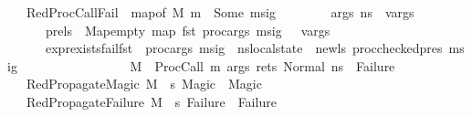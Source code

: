 \begin{isabellebody}
\ \ {\isacharbar}{\kern0pt}\ RedProcCallFail{\isacharcolon}{\kern0pt}\ {\isachardoublequoteopen}{\isasymlbrakk}\ map{\isacharunderscore}{\kern0pt}of\ M\ m\ {\isacharequal}{\kern0pt}\ Some\ msig{\isacharsemicolon}{\kern0pt}\isanewline
\ \ \ \ \ \ {\isasymLambda}{\isacharcomma}{\kern0pt}{\isasymGamma}{\isacharcomma}{\kern0pt}{\isasymOmega}\ {\isasymturnstile}\ {\isasymlangle}args{\isacharcomma}{\kern0pt}\ n{\isacharunderscore}{\kern0pt}s{\isasymrangle}\ {\isacharbrackleft}{\kern0pt}{\isasymDown}{\isacharbrackright}{\kern0pt}\ v{\isacharunderscore}{\kern0pt}args{\isacharsemicolon}{\kern0pt}\isanewline
\ \ \ \ \ \ pre{\isacharunderscore}{\kern0pt}ls\ {\isacharequal}{\kern0pt}\ Map{\isachardot}{\kern0pt}empty{\isacharparenleft}{\kern0pt}\ {\isacharparenleft}{\kern0pt}map\ fst\ {\isacharparenleft}{\kern0pt}proc{\isacharunderscore}{\kern0pt}args\ msig\ {\isacharparenright}{\kern0pt}{\isacharparenright}{\kern0pt}\ {\isacharbrackleft}{\kern0pt}{\isasymmapsto}{\isacharbrackright}{\kern0pt}\ v{\isacharunderscore}{\kern0pt}args\ \ {\isacharparenright}{\kern0pt}\ {\isacharsemicolon}{\kern0pt}\isanewline
\ \ \ \ \ \ expr{\isacharunderscore}{\kern0pt}exists{\isacharunderscore}{\kern0pt}fail{\isacharparenleft}{\kern0pt}fst\ {\isasymLambda}{\isacharcomma}{\kern0pt}\ proc{\isacharunderscore}{\kern0pt}args\ msig{\isacharparenright}{\kern0pt}\ {\isasymGamma}\ {\isasymOmega}{\isacharparenleft}{\kern0pt}n{\isacharunderscore}{\kern0pt}s{\isasymlparr}local{\isacharunderscore}{\kern0pt}state\ {\isacharcolon}{\kern0pt}{\isacharequal}{\kern0pt}\ new{\isacharunderscore}{\kern0pt}ls{\isasymrparr}{\isacharparenright}{\kern0pt}\ {\isacharparenleft}{\kern0pt}proc{\isacharunderscore}{\kern0pt}checked{\isacharunderscore}{\kern0pt}pres\ msig{\isacharparenright}{\kern0pt}\ {\isasymrbrakk}\ {\isasymLongrightarrow}\isanewline
\ \ \ \ \ \ \ \ \ \ \ \ \ \ \ M{\isacharcomma}{\kern0pt}{\isasymLambda}{\isacharcomma}{\kern0pt}{\isasymGamma}{\isacharcomma}{\kern0pt}{\isasymOmega}\ {\isasymturnstile}\ {\isasymlangle}ProcCall\ m\ args\ rets{\isacharcomma}{\kern0pt}\ Normal\ n{\isacharunderscore}{\kern0pt}s{\isasymrangle}\ {\isasymrightarrow}\ Failure{\isachardoublequoteclose}\isanewline
\ \ {\isacharbar}{\kern0pt}\ RedPropagateMagic{\isacharcolon}{\kern0pt}\ {\isachardoublequoteopen}M{\isacharcomma}{\kern0pt}{\isasymLambda}{\isacharcomma}{\kern0pt}{\isasymGamma}{\isacharcomma}{\kern0pt}{\isasymOmega}\ {\isasymturnstile}\ {\isasymlangle}s{\isacharcomma}{\kern0pt}\ Magic{\isasymrangle}\ {\isasymrightarrow}\ Magic{\isachardoublequoteclose}\isanewline
\ \ {\isacharbar}{\kern0pt}\ RedPropagateFailure{\isacharcolon}{\kern0pt}\ {\isachardoublequoteopen}M{\isacharcomma}{\kern0pt}{\isasymLambda}{\isacharcomma}{\kern0pt}{\isasymGamma}{\isacharcomma}{\kern0pt}{\isasymOmega}\ {\isasymturnstile}\ {\isasymlangle}s{\isacharcomma}{\kern0pt}\ Failure{\isasymrangle}\ {\isasymrightarrow}\ Failure{\isachardoublequoteclose}\isanewline

\end{isabellebody}
